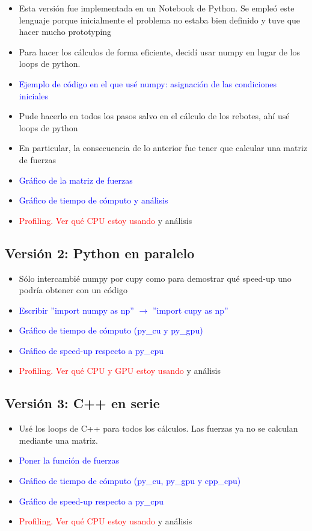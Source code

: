 \documentclass[aps,prb,twocolumn,superscriptaddress,floatfix,longbibliography]{revtex4-2}
\newcounter{para}
\begin{document}
\begin{itemize}
\begin{itemize}
    \item Esta versión fue implementada en un Notebook de Python. Se empleó este lenguaje porque inicialmente el problema no estaba bien definido y tuve que hacer mucho prototyping
    \item Para hacer los cálculos de forma eficiente, decidí usar numpy en lugar de los loops de python.
    \item \textcolor{blue}{Ejemplo de código en el que usé numpy: asignación de las condiciones iniciales}
    \item Pude hacerlo en todos los pasos salvo en el cálculo de los rebotes, ahí usé loops de python
    \item En particular, la consecuencia de lo anterior fue tener que calcular una matriz de fuerzas
    \item \textcolor{blue}{Gráfico de la matriz de fuerzas}
    \item \textcolor{blue}{Gráfico de tiempo de cómputo y análisis}
    \item \textcolor{red}{Profiling. Ver qué CPU estoy usando} y análisis
\end{itemize}

\subsection{Versión 2: Python en paralelo}

\begin{itemize}
    \item Sólo intercambié numpy por cupy como para demostrar qué speed-up uno podría obtener con un código 
    \item \textcolor{blue}{Escribir ''import numpy as np'' $\rightarrow$ ''import cupy as np''}
    \item \textcolor{blue}{Gráfico de tiempo de cómputo (py_cu y py_gpu)}
    \item \textcolor{blue}{Gráfico de speed-up respecto a py_cpu}
    \item \textcolor{red}{Profiling. Ver qué CPU y GPU estoy usando} y análisis
\end{itemize}

\subsection{Versión 3: C++ en serie}

\begin{itemize}
    \item Usé los loops de C++ para todos los cálculos. Las fuerzas ya no se calculan mediante una matriz.
    \item \textcolor{blue}{Poner la función de fuerzas}
    \item \textcolor{blue}{Gráfico de tiempo de cómputo (py_cu, py_gpu y cpp_cpu)}
    \item \textcolor{blue}{Gráfico de speed-up respecto a py_cpu}
    \item \textcolor{red}{Profiling. Ver qué CPU estoy usando} y análisis
\end{itemize}


\end{itemize}
\end{document}
